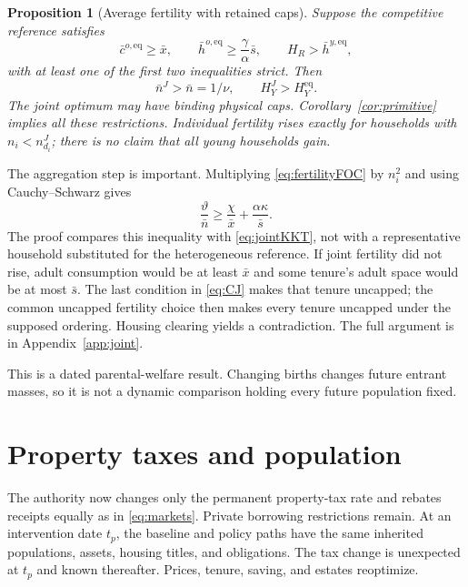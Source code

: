 \documentclass[11pt]{article}
\newtheorem{proposition}{Proposition}
\newcommand{\eq}{\mathrm{eq}}
\newcommand{\tht}{\vartheta}
\begin{document}
\begin{proposition}[Average fertility with retained caps]\label{prop:joint}
Suppose the competitive reference satisfies
\begin{equation}
 \bar c^{o,\eq}\ge\bar x,\qquad
 \bar h^{o,\eq}\ge\frac\gamma\alpha\bar s,\qquad
 H_R>\bar h^{y,\eq},\label{eq:CJ}
\end{equation}
with at least one of the first two inequalities strict. Then
\begin{equation}
 \bar n^J>\bar n=1/\nu,\qquad H_Y^J>H_Y^{\eq}.\label{eq:jointresult}
\end{equation}
The joint optimum may have binding physical caps. Corollary~\ref{cor:primitive} implies all these restrictions. Individual fertility rises exactly for households with $n_i<n_{d_i}^J$; there is no claim that all young households gain.
\end{proposition}

The aggregation step is important. Multiplying \eqref{eq:fertilityFOC} by $n_i^2$ and using Cauchy--Schwarz gives
\begin{equation}
 \frac\tht{\bar n}\ge\frac\chi{\bar x}+\frac{\alpha\kappa}{\bar s}.\label{eq:CS}
\end{equation}
The proof compares this inequality with \eqref{eq:jointKKT}, not with a representative household substituted for the heterogeneous reference. If joint fertility did not rise, adult consumption would be at least $\bar x$ and some tenure's adult space would be at most $\bar s$. The last condition in \eqref{eq:CJ} makes that tenure uncapped; the common uncapped fertility choice then makes every tenure uncapped under the supposed ordering. Housing clearing yields a contradiction. The full argument is in Appendix~\ref{app:joint}.

This is a dated parental-welfare result. Changing births changes future entrant masses, so it is not a dynamic comparison holding every future population fixed.

\section{Property taxes and population}\label{sec:policy}
The authority now changes only the permanent property-tax rate and rebates receipts equally as in \eqref{eq:markets}. Private borrowing restrictions remain. At an intervention date $t_p$, the baseline and policy paths have the same inherited populations, assets, housing titles, and obligations. The tax change is unexpected at $t_p$ and known thereafter. Prices, tenure, saving, and estates reoptimize.
\end{document}
